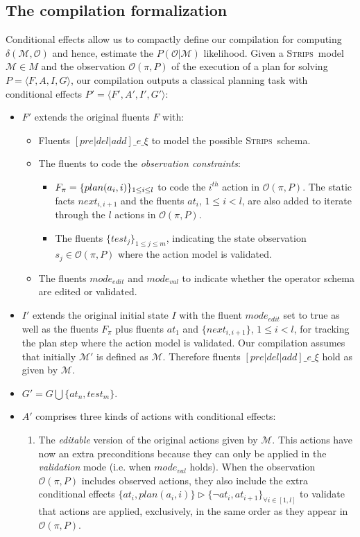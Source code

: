 \documentclass[letterpaper]{article} %
\newcommand{\tup}[1]{{\langle #1 \rangle}}
\newcommand{\strips}{\textsc{Strips}}     %
\begin{document}
\subsection{The compilation formalization}
Conditional effects allow us to compactly define our compilation for computing $\delta(\mathcal{M},\mathcal{O})$ and hence, estimate the $P(\mathcal{O}|\mathcal{M})$ likelihood. Given a \strips\ model $\mathcal{M}\in M$ and the observation $\mathcal{O}(\pi,P)$ of the execution of a plan for solving $P=\tup{F,A,I,G}$, our compilation outputs a classical planning task with conditional effects $P'=\tup{F',A',I',G'}$:
\begin{itemize}
\item $F'$ extends the original fluents $F$ with:
\begin{itemize}
\item Fluents $[pre|del|add]\_e\_\xi$ to model the possible \strips\ schema. 
\item The fluents to code the {\em observation constraints}:
\begin{itemize}
\item $F_{\pi}=\{plan(a_i,i)\}_{\small 1\leq i\leq l}$ to code the $i^{th}$ action in $\mathcal{O}(\pi,P)$. The static facts $next_{i,i+1}$ and the fluents $at_i$, {\small $1\leq i< l$}, are also added to iterate through the $l$ actions in $\mathcal{O}(\pi,P)$.
\item The fluents $\{test_j\}_{1\leq j\leq m}$, indicating the state observation $s_j\in\mathcal{O}(\pi,P)$ where the action model is validated.
\end{itemize}
\item The fluents $mode_{edit}$ and $mode_{val}$ to indicate whether the operator schema are edited or validated.
\end{itemize}
\item $I'$ extends the original initial state $I$ with the fluent $mode_{edit}$ set to true as well as the fluents $F_{\pi}$ plus fluents $at_1$ and $\{next_{i,i+1}\}$, {\small $1\leq i<l$}, for tracking the plan step where the action model is validated. Our compilation assumes that initially $\mathcal{M}'$ is defined as $\mathcal{M}$. Therefore fluents $[pre|del|add]\_e\_\xi$ hold as given by $\mathcal{M}$.

\item $G'=G\bigcup\{at_n,test_m\}$.
\item $A'$ comprises three kinds of actions with conditional effects:
\begin{enumerate}
\item The {\em editable} version of the original actions given by $\mathcal{M}$. This actions have now an extra preconditions because they can only be applied in the {\em validation} mode (i.e. when $mode_{val}$ holds). When the observation $\mathcal{O}(\pi,P)$ includes observed actions, they also include the extra conditional effects $\{at_{i},plan(a_i,i)\}\rhd\{\neg at_{i},at_{i+1}\}_{\forall i\in [1,l]}$ to validate that actions are applied, exclusively, in the same order as they appear in $\mathcal{O}(\pi,P)$.\\


\end{enumerate}
\end{itemize}
\end{document}

